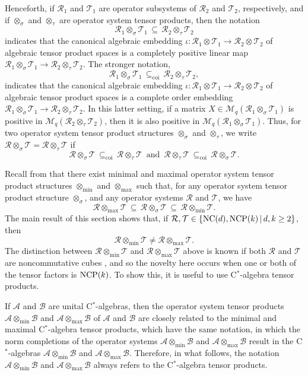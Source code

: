 \documentclass{amsart}
\theoremstyle{definition}
\theoremstyle{remark}
\newcommand{\B}{\mathcal{B}}
\newcommand{\M}{\mathcal{M}}
\newcommand\osr{{\mathcal R}}
\newcommand\ost{{\mathcal T}}
\newcommand\omin{\otimes_{\textrm{min}}}
\newcommand\omax{\otimes_{\textrm{max}}}
\newcommand{\A}{\mathcal{A}}                    %
\numberwithin{equation}{section}
\begin{document}
Henceforth, if
$\osr_1$ and $\ost_1$ are operator subsystems of $\osr_2$ and $\ost_2$, respectively, and if $\otimes_\sigma$ and $\otimes_\tau$ are
operator system tensor products, then the notation 
\[
\osr_1\otimes_\sigma\ost_1 \,\subseteq\, \osr_2\otimes_\tau\ost_2
\]
indicates that the canonical algebraic embedding $\iota:\osr_1\otimes\ost_1\rightarrow\osr_2\otimes\ost_2$ of algebraic tensor product spaces is 
a completely positive linear map $\osr_1\otimes_\sigma\ost_1 \rightarrow \osr_2\otimes_\tau\ost_2$.
The stronger notation, 
\[
\osr_1\otimes_\sigma\ost_1 \,\subseteq_{\textrm{coi}}\, \osr_2\otimes_\tau\ost_2,
\]
indicates that the canonical algebraic embedding $\iota:\osr_1\otimes\ost_1\rightarrow\osr_2\otimes\ost_2$ of algebraic tensor product spaces is 
a complete order embedding $\osr_1\otimes_\sigma\ost_1 \rightarrow \osr_2\otimes_\tau\ost_2$. In this latter setting, if a
matrix $X\in\M_q(\osr_1\otimes_\sigma\ost_1)$ is positive in $\M_q(\osr_2\otimes_\tau\ost_2)$, then it is also positive in $\M_q(\osr_1\otimes_\sigma\ost_1)$.
Thus, for two operator system tensor product structures $\otimes_\sigma$ and $\otimes_\tau$, we write
$\osr\otimes_\sigma\ost= \osr\otimes_\tau\ost$ if
\[
\osr\otimes_\sigma\ost\,\subseteq_{\textrm{coi}}\, \osr\otimes_\tau\ost
\,\mbox{ and }\,
\osr\otimes_\tau\ost\,\subseteq_{\textrm{coi}}\, \osr\otimes_\sigma\ost.
\]

Recall from \cite{kavruk--paulsen--todorov--tomforde2011} that
there exist minimal and maximal operator system tensor product structures $\omin$ and $\omax$ 
such that, for any operator system tensor product structure
 $\otimes_\sigma$, and any operator systems $\osr$ and $\ost$, we have
 \[
 \osr\omax\ost\,\subseteq\,\osr\otimes_\sigma\ost\,\subseteq\,\osr\omin\ost.
 \]
 The main result of this section shows that, if $\osr,\ost\in\{\mbox{\textrm{NC}}(d),\mbox{\textrm{NCP}}(k)\,|\, d,k\geq 2\}$, then
 \[
 \osr\omin\ost \not= \osr\omax\ost.
 \]
 The distinction between $\osr\omin\ost$ and $\osr\omax\ost$ above 
 is known if both $\osr$ and $\ost$ are noncommutative cubes \cite{farenick--kavruk--paulsen--todorov2014}, and so the
 novelty here occurs when one or both of the tensor factors is $\mbox{\textrm{NCP}}(k)$. To show this, it is useful to use C$^*$-algebra tensor products.
 
 If $\A$ and $\B$ are unital C$^*$-algebras, then the operator system tensor products $\A\omin\B$ and $\A\omax\B$ of $\A$ and $\B$
 are closely related to the minimal and maximal C$^*$-algebra tensor products, which have the same notation, in which the norm completions of
 the operator systems $\A\omin\B$ and $\A\omax\B$ result in the C$^*$-algebras $\A\omin\B$ and $\A\omax\B$. Therefore, in what follows,
 the notation $\A\omin\B$ and $\A\omax\B$ always refers to the C$^*$-algebra tensor products.
 
\end{document}

